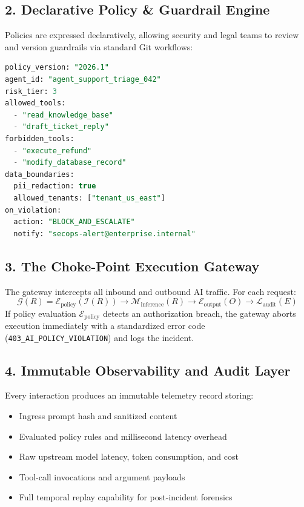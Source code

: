 \documentclass[11pt,a4paper]{article}
\begin{document}
\subsection{2. Declarative Policy \& Guardrail Engine}
Policies are expressed declaratively, allowing security and legal teams to review and version guardrails via standard Git workflows:

\begin{lstlisting}[language=SQL]
policy_version: "2026.1"
agent_id: "agent_support_triage_042"
risk_tier: 3
allowed_tools:
  - "read_knowledge_base"
  - "draft_ticket_reply"
forbidden_tools:
  - "execute_refund"
  - "modify_database_record"
data_boundaries:
  pii_redaction: true
  allowed_tenants: ["tenant_us_east"]
on_violation:
  action: "BLOCK_AND_ESCALATE"
  notify: "secops-alert@enterprise.internal"
\end{lstlisting}

\subsection{3. The Choke-Point Execution Gateway}
The gateway intercepts all inbound and outbound AI traffic. For each request:
\begin{equation}
\mathcal{G}(R) = \mathcal{E}_{\text{policy}}(\mathcal{I}(R)) \to \mathcal{M}_{\text{inference}}(R) \to \mathcal{E}_{\text{output}}(O) \to \mathcal{L}_{\text{audit}}(E)
\end{equation}
If policy evaluation $\mathcal{E}_{\text{policy}}$ detects an authorization breach, the gateway aborts execution immediately with a standardized error code (\texttt{403\_AI\_POLICY\_VIOLATION}) and logs the incident.

\subsection{4. Immutable Observability and Audit Layer}
Every interaction produces an immutable telemetry record storing:
\begin{itemize}
    \item Ingress prompt hash and sanitized content
    \item Evaluated policy rules and millisecond latency overhead
    \item Raw upstream model latency, token consumption, and cost
    \item Tool-call invocations and argument payloads
    \item Full temporal replay capability for post-incident forensics
\end{itemize}
\end{document}
